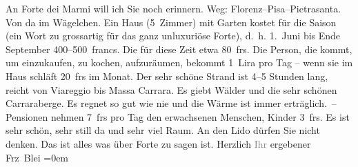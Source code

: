 \begin{ledgroupsized}[t]{13cm}
           An Forte dei Marmi will ich Sie noch erinnern.
               Weg: Florenz–Pisa–Pietrasanta. Von da im Wägelchen.
               Ein Haus (5 Zimmer) mit Garten kostet für die Saison (ein Wort zu grossartig für das
               ganz unluxuriöse Forte), d. h.
                  1. Juni bis Ende September 400–500 francs. Die \label{K_L01998-3v}\label{K_L01998-3h} für diese Zeit etwa 80 frs.
               Die Person, die kommt, um einzukaufen, zu kochen, aufzuräumen, bekommt 1 Lira pro Tag
               – wenn sie im Haus schläft 20 frs im Monat. {\pb}Der sehr schöne Strand ist 4–5 Stunden
               lang, reicht von Viareggio bis Massa Carrara. Es giebt Wälder und die sehr
               schönen Carraraberge. Es regnet so gut wie nie
               und die Wärme ist immer erträglich. –\pend
           \pstart
           Pensionen nehmen 7 frs pro Tag den erwachsenen Menschen, Kinder 3 frs.\pend
           \pstart
           Es ist sehr schön, sehr still da und sehr viel Raum. An den Lido dürfen Sie nicht denken.\pend
           \pstart
           Das ist alles was über Forte zu sagen ist.\pend
           \pstart
           Herzlich \textcolor{gray}{Ihr} ergebener{\\[\baselineskip]}\spacefill\mbox{Frz Blei}\pend
           \leftskip=0em{}
         
         \endnumbering{}\end{ledgroupsized}  \newcommand{\dateiname}{L01998}\newcommand{\titel}{Franz Blei an Arthur Schnitzler, [Anfang? Januar 1911]}\newcommand{\editorInnen}{Martin Anton Müller und Gerd-Hermann Susen}
      